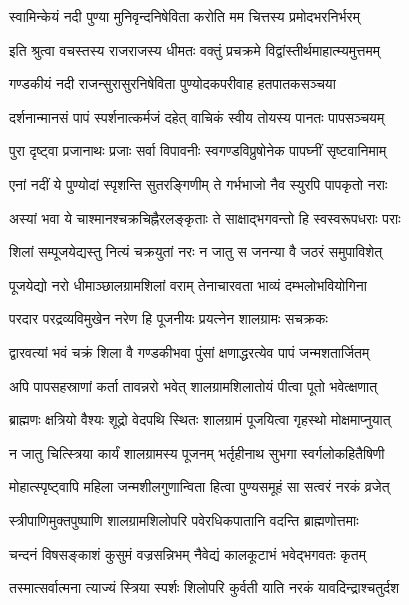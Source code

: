 \twolineshloka
{स्वामिन्केयं नदी पुण्या मुनिवृन्दनिषेविता}
{करोति मम चित्तस्य प्रमोदभरनिर्भरम्}%

\twolineshloka
{इति श्रुत्वा वचस्तस्य राजराजस्य धीमतः}
{वक्तुं प्रचक्रमे विद्वांस्तीर्थमाहात्म्यमुत्तमम्}%


\twolineshloka
{गण्डकीयं नदी राजन्सुरासुरनिषेविता}
{पुण्योदकपरीवाह हतपातकसञ्चया}%

\twolineshloka
{दर्शनान्मानसं पापं स्पर्शनात्कर्मजं दहेत्}
{वाचिकं स्वीय तोयस्य पानतः पापसञ्चयम्}%

\twolineshloka
{पुरा दृष्ट्वा प्रजानाथः प्रजाः सर्वा विपावनीः}
{स्वगण्डविप्रुषोनेक पापघ्नीं सृष्टवानिमाम्}%

\twolineshloka
{एनां नदीं ये पुण्योदां स्पृशन्ति सुतरङ्गिणीम्}
{ते गर्भभाजो नैव स्युरपि पापकृतो नराः}%

\twolineshloka
{अस्यां भवा ये चाश्मानश्चक्रचिह्नैरलङ्कृताः}
{ते साक्षाद्भगवन्तो हि स्वस्वरूपधराः पराः}%

\twolineshloka
{शिलां सम्पूजयेद्यस्तु नित्यं चक्रयुतां नरः}
{न जातु स जनन्या वै जठरं समुपाविशेत्}%

\twolineshloka
{पूजयेद्यो नरो धीमाञ्छालग्रामशिलां वराम्}
{तेनाचारवता भाव्यं दम्भलोभवियोगिना}%

\twolineshloka
{परदार परद्रव्यविमुखेन नरेण हि}
{पूजनीयः प्रयत्नेन शालग्रामः सचक्रकः}%

\twolineshloka
{द्वारवत्यां भवं चक्रं शिला वै गण्डकीभवा}
{पुंसां क्षणाद्धरत्येव पापं जन्मशतार्जितम्}%

\twolineshloka
{अपि पापसहस्राणां कर्ता तावन्नरो भवेत्}
{शालग्रामशिलातोयं पीत्वा पूतो भवेत्क्षणात्}%

\twolineshloka
{ब्राह्मणः क्षत्रियो वैश्यः शूद्रो वेदपथि स्थितः}
{शालग्रामं पूजयित्वा गृहस्थो मोक्षमाप्नुयात्}%

\twolineshloka
{न जातु चित्स्त्रिया कार्यं शालग्रामस्य पूजनम्}
{भर्तृहीनाथ सुभगा स्वर्गलोकहितैषिणी}%

\twolineshloka
{मोहात्स्पृष्ट्वापि महिला जन्मशीलगुणान्विता}
{हित्वा पुण्यसमूहं सा सत्वरं नरकं व्रजेत्}%

\twolineshloka
{स्त्रीपाणिमुक्तपुष्पाणि शालग्रामशिलोपरि}
{पवेरधिकपातानि वदन्ति ब्राह्मणोत्तमाः}%

\twolineshloka
{चन्दनं विषसङ्काशं कुसुमं वज्रसन्निभम्}
{नैवेद्यं कालकूटाभं भवेद्भगवतः कृतम्}%

\twolineshloka
{तस्मात्सर्वात्मना त्याज्यं स्त्रिया स्पर्शः शिलोपरि}
{कुर्वती याति नरकं यावदिन्द्राश्चतुर्दश}%

